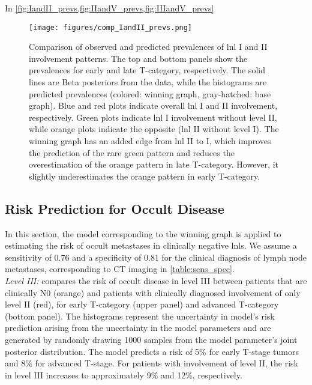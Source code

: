\documentclass[twocolumn]{aastex631}
\begin{document}
In \cref{fig:IandII_prevs,fig:IIandV_prevs,fig:IIIandV_prevs}

\begin{figure*}
    \begin{centering}
        \texttt{[image: figures/comp\_IandII\_prevs.png]}
        \caption{Comparison of observed and predicted prevalences of \gls{lnl} I and II involvement patterns. The top and bottom panels show the prevalences for early and late T-category, respectively. The solid lines are Beta posteriors from the data, while the histograms are predicted prevalences (colored: winning graph, gray-hatched: base graph). Blue and red plots indicate overall \gls{lnl} I and II involvement, respectively. Green plots indicate \gls{lnl} I involvement without level II, while orange plots indicate the opposite (\gls{lnl} II without level I). The winning graph has an added edge from \gls{lnl} II to I, which improves the prediction of the rare green pattern and reduces the overestimation of the orange pattern in late T-category. However, it slightly underestimates the orange pattern in early T-category.}
        \label{fig:IandII_prevs}
    \end{centering}
\end{figure*}




\subsection{Risk Prediction for Occult Disease}
\label{subsec:results:risk_prediction}
In this section, the model corresponding to the winning graph is applied to estimating the risk of occult metastases in clinically negative \glspl{lnl}. We assume a sensitivity of 0.76 and a specificity of 0.81 for the clinical diagnosis of lymph node metastases, corresponding to CT imaging in \cref{table:sens_spec}. \\

{\it Level III:}  compares the risk of occult disease in level III between patients that are clinically N0 (orange) and patients with clinically diagnosed involvement of only level II (red), for early T-category (upper panel) and advanced T-category (bottom panel). The histograms represent the uncertainty in model's risk prediction arising from the uncertainty in the model parameters and are generated by randomly drawing 1000 samples from the model parameter's joint posterior distribution. The model predicts a risk of 5\% for early T-stage tumors and 8\% for advanced T-stage. For patients with involvement of level II, the risk in level III increases to approximately 9\% and 12\%, respectively.
\end{document}
